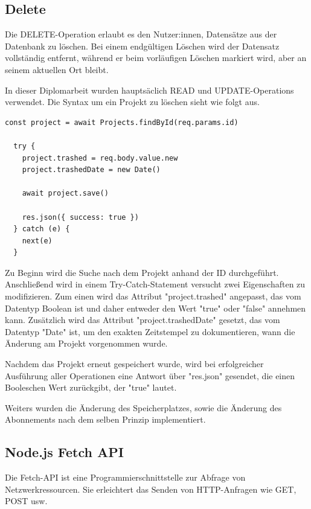 \subsection{Delete}


Die DELETE-Operation erlaubt es den Nutzer:innen, Datensätze aus der Datenbank zu löschen. Bei einem endgültigen Löschen wird der Datensatz vollständig entfernt, während er beim vorläufigen Löschen markiert wird, aber an seinem aktuellen Ort bleibt.



In dieser Diplomarbeit wurden hauptsäclich READ und UPDATE-Operations verwendet. Die Syntax um ein Projekt zu löschen sieht wie folgt aus.

\begin{lstlisting}[caption=Delete-Operation]
    const project = await Projects.findById(req.params.id)

  try {
    project.trashed = req.body.value.new
    project.trashedDate = new Date()

    await project.save()

    res.json({ success: true })
  } catch (e) {
    next(e)
  }
\end{lstlisting}

Zu Beginn wird die Suche nach dem Projekt anhand der ID durchgeführt. Anschließend wird in einem Try-Catch-Statement versucht zwei Eigenschaften zu modifizieren. Zum einen wird das Attribut "project.trashed" angepasst, das vom Datentyp Boolean ist und daher entweder den Wert "true" oder "false" annehmen kann. Zusätzlich wird das Attribut "project.trashedDate" gesetzt, das vom Datentyp "Date" ist, um den exakten Zeitstempel zu dokumentieren, wann die Änderung am Projekt vorgenommen wurde.

Nachdem das Projekt erneut gespeichert wurde, wird bei erfolgreicher Ausführung aller Operationen eine Antwort über "res.json" gesendet, die einen Booleschen Wert zurückgibt, der "true" lautet.


Weiters wurden die Änderung des Speicherplatzes, sowie die Änderung des Abonnements nach dem selben Prinzip implementiert.
\cite{CRUD_Operations}

\subsection{Node.js Fetch API}
Die Fetch-API ist eine Programmierschnittstelle zur Abfrage von Netzwerkressourcen. Sie erleichtert das Senden von HTTP-Anfragen wie GET, POST usw.

